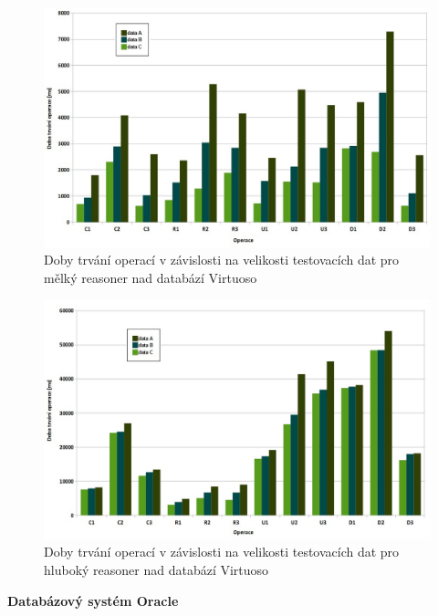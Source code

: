 \documentclass{projekt}
\begin{document}
\begin{figure}[htb!]
\begin{center}
\includegraphics[scale=0.45]{virtuosoShallow.jpg}
\caption{Doby trvání operací v závislosti na velikosti testovacích dat pro mělký reasoner nad databází Virtuoso}
\end{center}
\end{figure}


\begin{figure}[htb!]
\begin{center}
\includegraphics[scale=0.45]{virtuosoDeep.jpg}
\caption{Doby trvání operací v závislosti na velikosti testovacích dat pro hluboký reasoner nad databází Virtuoso}
\end{center}
\end{figure}

\newpage


{\bf Databázový systém Oracle}
\end{document}
